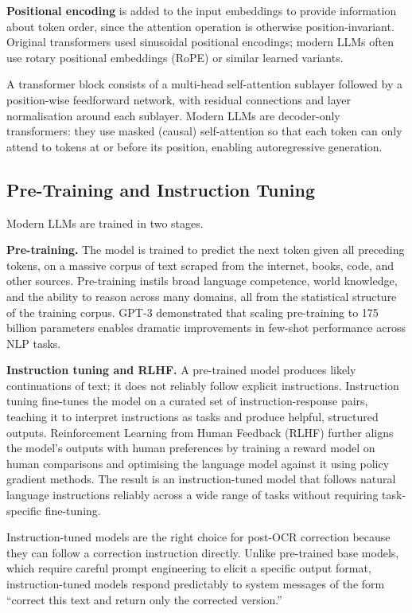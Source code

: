 \textbf{Positional encoding} is added to the input embeddings to provide
information about token order, since the attention operation is otherwise
position-invariant.
Original transformers used sinusoidal positional encodings; modern LLMs often
use rotary positional embeddings (RoPE) or similar learned variants.

A transformer block consists of a multi-head self-attention sublayer followed
by a position-wise feedforward network, with residual connections and layer
normalisation around each sublayer.
Modern LLMs are decoder-only transformers: they use masked (causal) self-attention
so that each token can only attend to tokens at or before its position, enabling
autoregressive generation.

\subsection{Pre-Training and Instruction Tuning}
\label{subsec:pretraining}

Modern LLMs are trained in two stages.

\textbf{Pre-training.}
The model is trained to predict the next token given all preceding tokens, on a
massive corpus of text scraped from the internet, books, code, and other sources.
Pre-training instils broad language competence, world knowledge, and the ability
to reason across many domains, all from the statistical structure of the training
corpus.
GPT-3 \cite{brown2020language} demonstrated that scaling pre-training to 175
billion parameters enables dramatic improvements in few-shot performance across
NLP tasks.

\textbf{Instruction tuning and RLHF.}
A pre-trained model produces likely continuations of text; it does not
reliably follow explicit instructions.
Instruction tuning \cite{ouyang2022training} fine-tunes the model on a curated
set of instruction-response pairs, teaching it to interpret instructions as tasks
and produce helpful, structured outputs.
Reinforcement Learning from Human Feedback (RLHF) further aligns the model's
outputs with human preferences by training a reward model on human comparisons
and optimising the language model against it using policy gradient methods.
The result is an instruction-tuned model that follows natural language
instructions reliably across a wide range of tasks without requiring task-specific
fine-tuning.

Instruction-tuned models are the right choice for post-OCR correction because
they can follow a correction instruction directly.
Unlike pre-trained base models, which require careful prompt engineering to
elicit a specific output format, instruction-tuned models respond predictably
to system messages of the form ``correct this text and return only the corrected
version.''

